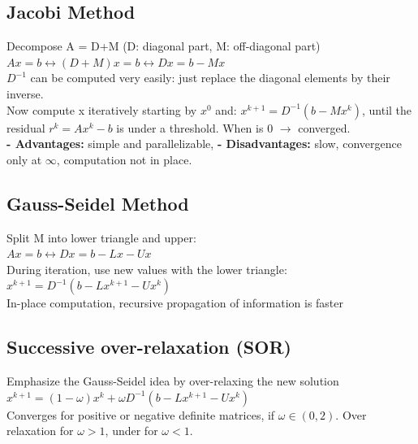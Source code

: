 \documentclass{article}
\begin{document}
\subsection{Jacobi Method}
Decompose A = D+M (D: diagonal part, M: off-diagonal part)\\
$Ax=b \leftrightarrow (D+M)x=b \leftrightarrow Dx=b-Mx$\\
$D^{-1}$ can be computed very easily: just replace the diagonal elements by their inverse.\\
Now compute x iteratively starting by $x^0$ and: $x^{k+1}=D^{-1}(b-Mx^k)$, until the residual $r^k=Ax^k-b$ is under a threshold. When is 0 $\rightarrow$ converged.\\
\textbf{- Advantages: } simple and parallelizable, \textbf{- Disadvantages: } slow, convergence only at $\infty$, computation not in place.
\subsection{Gauss-Seidel Method}
Split M into lower triangle and upper:\\
$Ax=b \leftrightarrow Dx=b-Lx-Ux$\\
During iteration, use new values with the lower triangle:\\
$x^{k+1}=D^{-1}(b-Lx^{k+1}-Ux^k)$\\
In-place computation, recursive propagation of information is faster\\
\subsection{Successive over-relaxation (SOR)}
Emphasize the Gauss-Seidel idea by over-relaxing the new solution
$x^{k+1}=(1-\omega)x^k+\omega D^{-1}(b-Lx^{k+1}-Ux^k)$\\
Converges for positive or negative definite matrices, if $\omega \in (0,2)$. Over relaxation for $\omega >1$, under for $\omega <1$.
\end{document}
